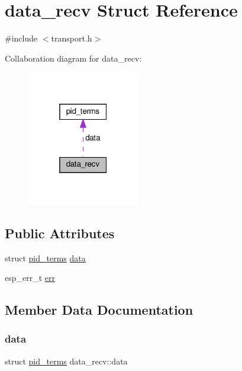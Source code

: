 \hypertarget{structdata__recv}{}\section{data\+\_\+recv Struct Reference}
\label{structdata__recv}


{\ttfamily \#include $<$transport.\+h$>$}



Collaboration diagram for data\+\_\+recv\+:\nopagebreak
\begin{figure}[H]
\begin{center}
\leavevmode
\includegraphics[width=139pt]{structdata__recv__coll__graph}
\end{center}
\end{figure}
\subsection*{Public Attributes}
\begin{DoxyCompactItemize}
\item 
struct \hyperlink{structpid__terms}{pid\+\_\+terms} \hyperlink{structdata__recv_af60b2e3d44df4ef57e1998ff55783920}{data}
\item 
esp\+\_\+err\+\_\+t \hyperlink{structdata__recv_a96d1938d8172e27035f655727f675273}{err}
\end{DoxyCompactItemize}


\subsection{Member Data Documentation}
\mbox{\label{structdata__recv_af60b2e3d44df4ef57e1998ff55783920}} 
\subsubsection{\texorpdfstring{data}{data}}
{\footnotesize\ttfamily struct \hyperlink{structpid__terms}{pid\+\_\+terms} data\+\_\+recv\+::data}

